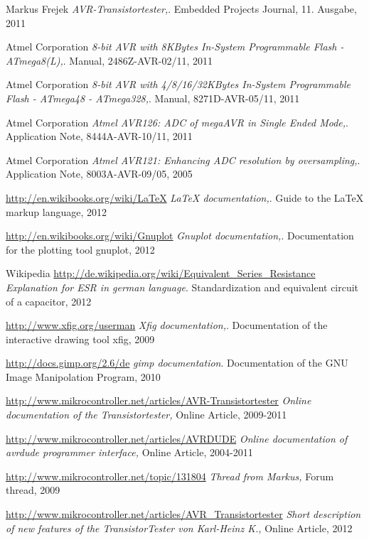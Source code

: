 \documentclass[12pt,a4paper,oneside,english]{report}
\begin{document}
\begin{thebibliography}{99}

Markus Frejek
\emph{AVR-Transistortester,}.
Embedded Projects Journal,
11. Ausgabe,
2011

Atmel Corporation
\emph{8-bit AVR with 8KBytes In-System Programmable Flash - ATmega8(L),}.
Manual,
2486Z-AVR-02/11,
2011

Atmel Corporation
\emph{8-bit AVR with 4/8/16/32KBytes In-System Programmable Flash - ATmega48 - ATmega328,}.
Manual,
8271D-AVR-05/11,
2011

Atmel Corporation
\emph{Atmel AVR126: ADC of megaAVR in Single Ended Mode,}.
Application Note,
8444A-AVR-10/11,
2011

Atmel Corporation
\emph{Atmel AVR121: Enhancing ADC resolution by oversampling,}.
Application Note,
8003A-AVR-09/05,
2005

\url{http://en.wikibooks.org/wiki/LaTeX}
\emph{LaTeX documentation,}.
Guide to the LaTeX markup language,
2012

\url{http://en.wikibooks.org/wiki/Gnuplot}
\emph{Gnuplot documentation,}.
Documentation for the plotting tool gnuplot,
2012

Wikipedia
\url{http://de.wikipedia.org/wiki/Equivalent_Series_Resistance}
\emph{Explanation for ESR in german language}.
Standardization and equivalent circuit of a capacitor,
2012


\url{http://www.xfig.org/userman}
\emph{Xfig documentation,}.
Documentation of the interactive drawing tool xfig,
2009

\url{http://docs.gimp.org/2.6/de}
\emph{gimp documentation}.
Documentation of the GNU Image Manipolation Program,
2010

\url{http://www.mikrocontroller.net/articles/AVR-Transistortester}
\emph{Online documentation of the Transistortester,}
Online Article,
2009-2011

\url{http://www.mikrocontroller.net/articles/AVRDUDE}
\emph{Online documentation of avrdude programmer interface,}
Online Article,
2004-2011

\url{http://www.mikrocontroller.net/topic/131804}
\emph{Thread from Markus,}
Forum thread, 
2009

\url{http://www.mikrocontroller.net/articles/AVR\_Transistortester}
\emph{Short description of new features of the TransistorTester von Karl-Heinz K.,}
Online Article,
2012


\end{thebibliography}
\end{document}
